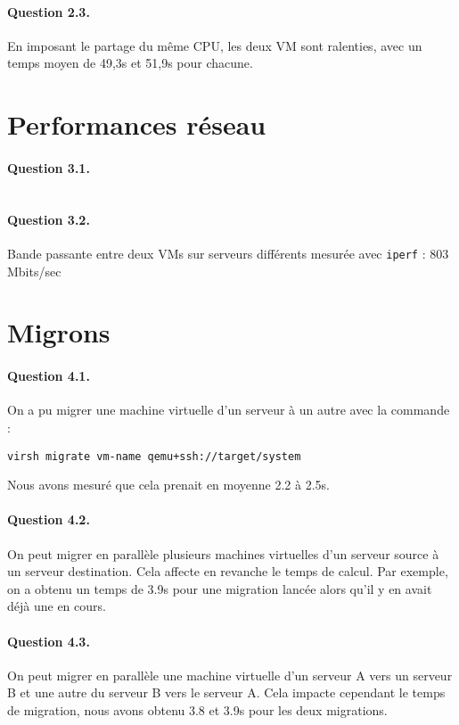 \documentclass[a4paper]{article}
\begin{document}
\paragraph{Question 2.3.} En imposant le partage du même CPU, les deux VM sont ralenties, avec un temps moyen de 49,3s et 51,9s pour chacune.

\section{Performances réseau}
\paragraph{Question 3.1.}
\begin{center}
\begin{tabular}{c c}

\end{tabular}
\end{center}

\paragraph{Question 3.2.}
Bande passante entre deux VMs sur serveurs différents mesurée avec \texttt{iperf} : 803 Mbits/sec

\section{Migrons}

\paragraph{Question 4.1.}
On a pu migrer une machine virtuelle d'un serveur à un autre avec la commande :

\texttt{virsh migrate vm-name qemu+ssh://target/system}

\noindent Nous avons mesuré que cela prenait en moyenne 2.2 à 2.5s.

\paragraph{Question 4.2.}
On peut migrer en parallèle plusieurs machines virtuelles d'un serveur source à un serveur destination.
Cela affecte en revanche le temps de calcul.
Par exemple, on a obtenu un temps de 3.9s pour une migration lancée alors qu'il y en avait déjà une en cours.

\paragraph{Question 4.3.}
On peut migrer en parallèle une machine virtuelle d'un serveur A vers un serveur B et une autre du serveur B vers le serveur A.
Cela impacte cependant le temps de migration, nous avons obtenu 3.8 et 3.9s pour les deux migrations.
\end{document}
